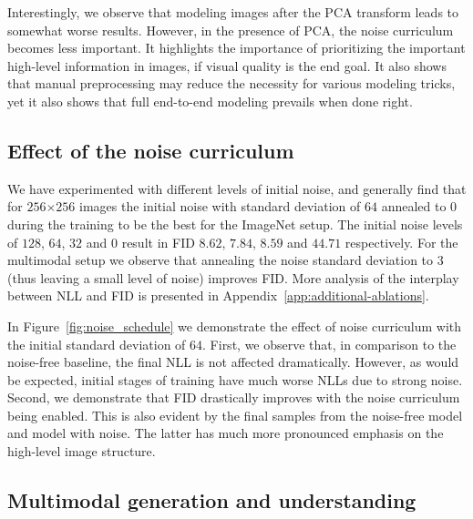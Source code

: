 \documentclass{article} %
\newcommand{\name}{JetFormer\xspace}
\begin{document}
Interestingly, we observe that modeling images after the PCA transform leads to somewhat worse results. However, in the presence of PCA, the noise curriculum becomes less important. It highlights the importance of prioritizing the important high-level information in images, if visual quality is the end goal. It also shows that manual preprocessing may reduce the necessity for various modeling tricks, yet it also shows that full end-to-end modeling prevails when done right.


\subsection{Effect of the noise curriculum}

We have experimented with different levels of initial noise, and generally find that for $256$$\times$$256$ images the initial noise with standard deviation of $64$ annealed to $0$ during the training to be the best for the ImageNet setup. The initial noise levels of $128$, $64$, $32$ and $0$ result in FID $8.62$, $7.84$, $8.59$ and $44.71$ respectively. For the multimodal setup we observe that annealing the noise standard deviation to $3$ (thus leaving a small level of noise) improves FID.
More analysis of the interplay between NLL and FID is presented in Appendix~\ref{app:additional-ablations}.

In Figure~\ref{fig:noise_schedule} we demonstrate the effect of noise curriculum with the initial standard deviation of $64$. First, we observe that, in comparison to the noise-free baseline, the final NLL is not affected dramatically. However, as would be expected, initial stages of training have much worse NLLs due to strong noise. Second, we demonstrate that FID drastically improves with the noise curriculum being enabled. This is also evident by the final samples from the noise-free model and model with noise. The latter has much more pronounced emphasis on the high-level image structure.

\subsection{Multimodal generation and understanding}

\begin{table}[t]\vspace{-0.3cm}
    \caption{Comparison with baselines from the literature for text-to-image generation (0-shot COCO FID-30k, $256$$\times$$256$). We included autoregressive (first group) and diffusion models (second group) which use raw image-text data (without e.g. re-captioning) and do not rely on pretrained text encoders. Models with image understanding capabilities are marked with T\&I. FID (ft.) is obtained when fine-tuning on the COCO training set, and NLL is measured on the COCO validation set after fine-tuning. \name is the only method which does not rely on any extra step.}
    \centering
    
\label{tab:t2i_table}
\vspace{-0.2cm}
\end{table}
\end{document}
